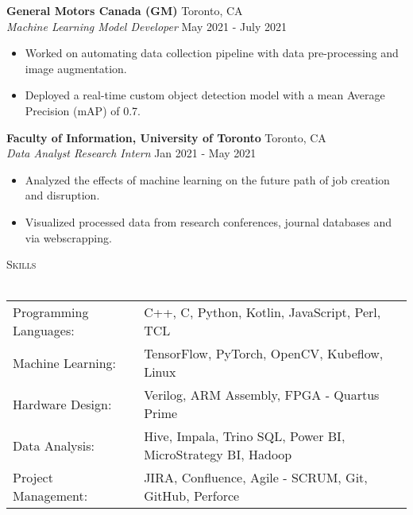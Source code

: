 \documentclass[a4paper]{article}
\newcommand{\lineunder} {
    \vspace*{-8pt} \\
    \hspace*{-18pt} \hrulefill \\
}
\newcommand{\header} [1] {
    {\hspace*{-18pt}\vspace*{6pt} \textsc{#1}}
    \vspace*{-6pt} \lineunder
}
\begin{document}
\textbf{General Motors Canada (GM)} \hfill Toronto, CA\\
\textit{Machine Learning Model Developer} \hfill May 2021 - July 2021\\
\vspace{-1mm}
\begin{itemize} \itemsep 1pt
	\item Worked on automating data collection pipeline with data pre-processing and image augmentation.
	\item Deployed a real-time custom object detection model with a mean Average Precision (mAP) of 0.7.
\end{itemize}

\textbf{Faculty of Information, University of Toronto} \hfill Toronto, CA\\
\textit{Data Analyst Research Intern} \hfill Jan 2021 - May 2021\\
\vspace{-1mm}
\begin{itemize} \itemsep 1pt
    \item Analyzed the effects of machine learning on the future path of job creation and disruption.
	\item Visualized processed data from research conferences, journal databases and via webscrapping.
\end{itemize}


\header{Skills}
\begin{tabular}{ l l }
	Programming Languages: & C++, C, Python, Kotlin, JavaScript, Perl, TCL                    \\
	Machine Learning:      & TensorFlow, PyTorch, OpenCV, Kubeflow, Linux                     \\
    Hardware Design:       & Verilog, ARM Assembly, FPGA - Quartus Prime                             \\
	Data Analysis:         & Hive, Impala, Trino SQL, Power BI, MicroStrategy BI, Hadoop      \\
	Project Management:    & JIRA, Confluence, Agile - SCRUM, Git, GitHub, Perforce           \\                               
\end{tabular}
\vspace{2mm}
\end{document}
